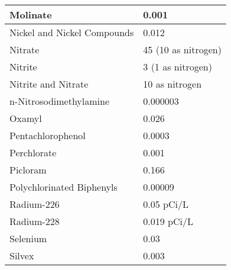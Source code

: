 \begin{table}[]
\begin{tabular}{|m{9cm}|m{5cm}|}
Molinate                                                            & 0.001                                                   \\ \hline
Nickel and Nickel Compounds                                         & 0.012                                                   \\ \hline
Nitrate                                                             & 45 (10 as   nitrogen)                                   \\ \hline
Nitrite                                                             & 3 (1 as   nitrogen)                                     \\ \hline
Nitrite and Nitrate                                                 & 10 as nitrogen                                          \\ \hline
n-Nitrosodimethylamine                                              & 0.000003                                                \\ \hline
Oxamyl                                                              & 0.026                                                   \\ \hline
Pentachlorophenol                                                   & 0.0003                                                  \\ \hline
Perchlorate                                                         & 0.001                                                   \\ \hline
Picloram                                                            & 0.166                                                   \\ \hline
Polychlorinated Biphenyls                                           & 0.00009                                                 \\ \hline
Radium-226                                                          & 0.05 pCi/L                                              \\ \hline
Radium-228                                                          & 0.019 pCi/L                                             \\ \hline
Selenium                                                            & 0.03                                                    \\ \hline
Silvex                                                              & 0.003                                                   \\ \hline

\end{tabular}
\end{table}
